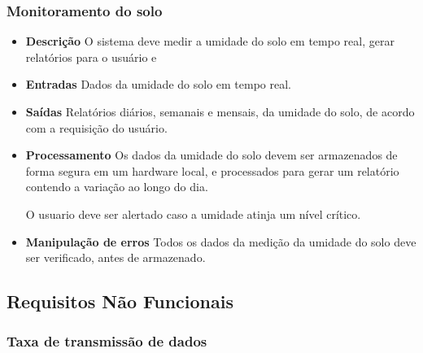 \subsubsection{Monitoramento do solo}
\begin{itemize}

	\item \textbf{Descrição}
	O sistema deve medir a umidade do solo em tempo real, gerar relatórios para o usuário e 

	\item \textbf{Entradas}
	Dados da umidade do solo em tempo real.

	\item \textbf{Saídas}
	Relatórios diários, semanais e mensais, da umidade do solo, de acordo com a requisição do usuário.

	\item \textbf{Processamento}
	Os dados da umidade do solo devem ser armazenados de forma segura em um hardware local, e processados para gerar um relatório contendo a variação ao longo do dia.

	O usuario deve ser alertado caso a umidade atinja um nível crítico.

	\item \textbf{Manipulação de erros}
	Todos os dados da medição da umidade do solo deve ser verificado, antes de armazenado.

\end{itemize}

\subsection{Requisitos Não Funcionais}

\subsubsection{Taxa de transmissão de dados}

